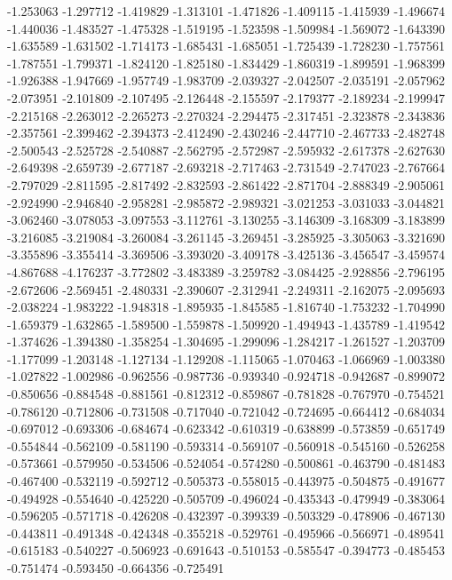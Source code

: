 -1.253063
-1.297712
-1.419829
-1.313101
-1.471826
-1.409115
-1.415939
-1.496674
-1.440036
-1.483527
-1.475328
-1.519195
-1.523598
-1.509984
-1.569072
-1.643390
-1.635589
-1.631502
-1.714173
-1.685431
-1.685051
-1.725439
-1.728230
-1.757561
-1.787551
-1.799371
-1.824120
-1.825180
-1.834429
-1.860319
-1.899591
-1.968399
-1.926388
-1.947669
-1.957749
-1.983709
-2.039327
-2.042507
-2.035191
-2.057962
-2.073951
-2.101809
-2.107495
-2.126448
-2.155597
-2.179377
-2.189234
-2.199947
-2.215168
-2.263012
-2.265273
-2.270324
-2.294475
-2.317451
-2.323878
-2.343836
-2.357561
-2.399462
-2.394373
-2.412490
-2.430246
-2.447710
-2.467733
-2.482748
-2.500543
-2.525728
-2.540887
-2.562795
-2.572987
-2.595932
-2.617378
-2.627630
-2.649398
-2.659739
-2.677187
-2.693218
-2.717463
-2.731549
-2.747023
-2.767664
-2.797029
-2.811595
-2.817492
-2.832593
-2.861422
-2.871704
-2.888349
-2.905061
-2.924990
-2.946840
-2.958281
-2.985872
-2.989321
-3.021253
-3.031033
-3.044821
-3.062460
-3.078053
-3.097553
-3.112761
-3.130255
-3.146309
-3.168309
-3.183899
-3.216085
-3.219084
-3.260084
-3.261145
-3.269451
-3.285925
-3.305063
-3.321690
-3.355896
-3.355414
-3.369506
-3.393020
-3.409178
-3.425136
-3.456547
-3.459574
-4.867688
-4.176237
-3.772802
-3.483389
-3.259782
-3.084425
-2.928856
-2.796195
-2.672606
-2.569451
-2.480331
-2.390607
-2.312941
-2.249311
-2.162075
-2.095693
-2.038224
-1.983222
-1.948318
-1.895935
-1.845585
-1.816740
-1.753232
-1.704990
-1.659379
-1.632865
-1.589500
-1.559878
-1.509920
-1.494943
-1.435789
-1.419542
-1.374626
-1.394380
-1.358254
-1.304695
-1.299096
-1.284217
-1.261527
-1.203709
-1.177099
-1.203148
-1.127134
-1.129208
-1.115065
-1.070463
-1.066969
-1.003380
-1.027822
-1.002986
-0.962556
-0.987736
-0.939340
-0.924718
-0.942687
-0.899072
-0.850656
-0.884548
-0.881561
-0.812312
-0.859867
-0.781828
-0.767970
-0.754521
-0.786120
-0.712806
-0.731508
-0.717040
-0.721042
-0.724695
-0.664412
-0.684034
-0.697012
-0.693306
-0.684674
-0.623342
-0.610319
-0.638899
-0.573859
-0.651749
-0.554844
-0.562109
-0.581190
-0.593314
-0.569107
-0.560918
-0.545160
-0.526258
-0.573661
-0.579950
-0.534506
-0.524054
-0.574280
-0.500861
-0.463790
-0.481483
-0.467400
-0.532119
-0.592712
-0.505373
-0.558015
-0.443975
-0.504875
-0.491677
-0.494928
-0.554640
-0.425220
-0.505709
-0.496024
-0.435343
-0.479949
-0.383064
-0.596205
-0.571718
-0.426208
-0.432397
-0.399339
-0.503329
-0.478906
-0.467130
-0.443811
-0.491348
-0.424348
-0.355218
-0.529761
-0.495966
-0.566971
-0.489541
-0.615183
-0.540227
-0.506923
-0.691643
-0.510153
-0.585547
-0.394773
-0.485453
-0.751474
-0.593450
-0.664356
-0.725491
